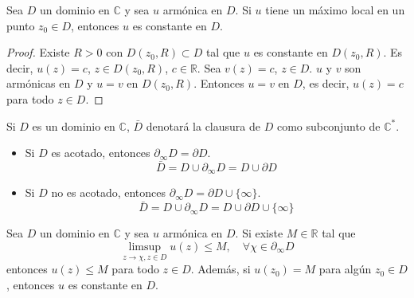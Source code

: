 \begin{theorem}
    Sea $D$ un dominio en $\mathbb{C}$ y sea $u$ armónica en $D$.
    Si $u$ tiene un máximo local en un punto $z_0 \in D$, entonces $u$ es constante en $D$.
\end{theorem}

\begin{proof}
    Existe $R > 0$ con $D(z_0, R) \subset D$ tal que $u$ es constante en $D(z_0, R)$.
    Es decir, $u(z) = c$, $z \in D(z_0, R)$, $c \in \mathbb{R}$.
    Sea $v(z) = c$, $z \in D$.
    $u$ y $v$ son armónicas en $D$ y $u = v$ en $D(z_0, R)$.
    Entonces $u = v$ en $D$, es decir, $u(z) = c$ para todo $z \in D$.
\end{proof}

\begin{notation}
    Si $D$ es un dominio en $\mathbb{C}$, $\bar{D}$ denotará la clausura de $D$ como subconjunto de $\mathbb{C}^\ast$.
    \begin{itemize}
        \item Si $D$ es acotado, entonces $\partial_\infty D = \partial D$.
              $$\bar{D} = D \cup \partial_\infty D = D \cup \partial D$$
        \item Si $D$ no es acotado, entonces $\partial_\infty D = \partial D \cup \{\infty\}$.
              $$\bar{D} = D \cup \partial_\infty D = D \cup \partial D \cup \{\infty\}$$
    \end{itemize}
\end{notation}

\begin{theorem}
    Sea $D$ un dominio en $\mathbb{C}$ y sea $u$ armónica en $D$.
    Si existe $M \in \mathbb{R}$ tal que
    $$\limsup_{z \to \chi, z \in D} u(z) \leq M, \quad \forall \chi \in \partial_\infty D$$
    entonces $u(z) \leq M$ para todo $z \in D$.
    Además, si $u(z_0) = M$ para algún $z_0 \in D$, entonces $u$ es constante en $D$.
\end{theorem}


